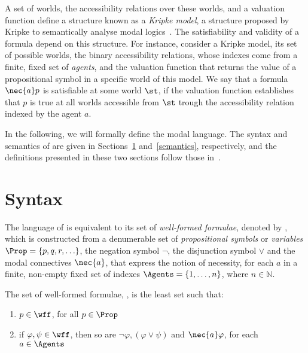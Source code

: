 A set of worlds, the accessibility relations over these worlds, and a valuation
function define a structure known as a \emph{Kripke model}, a structure proposed
by Kripke to semantically analyse modal logics~\cite{kripke:i}. The
satisfiability and validity of a formula depend on this structure. For instance,
consider a Kripke model, its set of possible worlds, the binary accessibility
relations, whose indexes come from a finite, fixed set of \emph{agents}, and the
valuation function that returns the value of a propositional symbol in a
specific world of this model. We say that a formula $\nec{a}p$ is satisfiable at
some world $\st$, if the valuation function establishes that $p$ is true at all
worlds accessible from $\st$ trough the accessibility relation indexed by the
agent $a$.

In the following, we will formally define the modal language. The
syntax and semantics of  are given in Sections~\ref{syntax}
and~\ref{semantics}, respectively, and the definitions presented in these two
sections follow those in~\cite{journals/jal/NalonD07}.

\section{Syntax}%
\label{syntax}

The language of  is equivalent to its set of \emph{well-formed
formulae}, denoted by \wff, which is constructed from a denumerable set of
\emph{propositional symbols} or \emph{variables} $\Prop = \{p, q, r, \ldots\}$,
the negation symbol $\neg$, the disjunction symbol $\lor$ and the modal
connectives $\nec{a}$, that express the notion of necessity, for each $a$ in a
finite, non-empty fixed set of indexes $\Agents = \{1, \ldots, n\}$, where $n
\in \mathbb{N}$.

\begin{definition}%
\label{def:wff}
    The set of well-formed formulae, \wff, is the least set such that:
    \begin{enumerate}
        \item $p \in \wff$, for all $p \in \Prop$
            \vspace{.2ex}
        \item if $\varphi, \psi \in \wff$, then so are $\neg \varphi, (\varphi
            \lor \psi)$ and $\nec{a} \varphi$, for each $a \in \Agents$
    \end{enumerate}
\end{definition}

